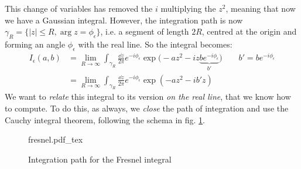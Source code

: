 \documentclass[../template.tex]{subfiles}
\begin{document}
\medskip

This change of variables has removed the $i$ multiplying the $z^2$, meaning that now we have a  Gaussian integral. However, the integration path is now $\gamma_R = \{|z| \leq R, \arg z = \phi_\epsilon \}$, i.e. a segment of length $2R$, centred at the origin and forming an angle $\phi_\epsilon$ with the real line. So the integral becomes:
\begin{align*}
    I_{\epsilon}(a,b) &= \lim_{R \to \infty} \int_{\gamma_R} \frac{\dd{z}}{2 \pi} e^{-i \phi_\epsilon} \exp \Big(-az^2 -iz\underbrace{b e^{-i \phi_\epsilon}}_{b'} \Big) \qquad b' = b e^{-i \phi_\epsilon}\\
    &= \lim_{R \to \infty} \int_{\gamma_R} \frac{\dd{z}}{2\pi} e^{-i \phi_\epsilon}  \exp(-a z^2 - ib'z)
\end{align*}
We want to \textit{relate} this integral to its version \textit{on the real line}, that we know how to compute. To do this, as always, we \textit{close} the path of integration and use the Cauchy integral theorem, following the schema in fig. \ref{fig:fresnel-path}. 

\begin{figure}[h!]
    \centering
    {fresnel.pdf_tex}\hspace{-8em}
    \caption{Integration path for the Fresnel integral\label{fig:fresnel-path}}
\end{figure}
\end{document}

